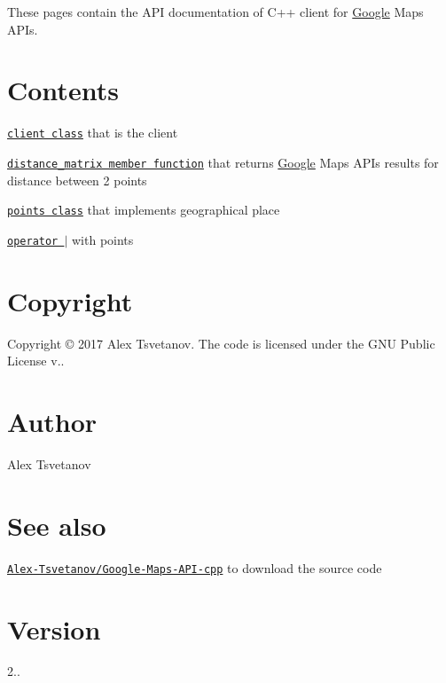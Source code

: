 \href{http://nlohmann.github.io/json}{\tt } \href{https://github.com/Alex-Tsvetanov/Google-Maps-API-cpp/blob/master/LICENSE}{\tt } \href{https://github.com/Alex-Tsvetanov/Google-Maps-API-cpp/releases}{\tt } \href{http://github.com/Alex-Tsvetanov/Google-Maps-API-cpp/issues}{\tt } \href{http://isitmaintained.com/project/Alex-Tsvetanov/Google-Maps-API-cpp}{\tt } \href{https://bestpractices.coreinfrastructure.org/projects/980}{\tt }

These pages contain the A\+PI documentation of C++ client for \hyperlink{a00038}{Google} Maps A\+P\+Is.

\section*{Contents}


\begin{DoxyItemize}
\item \href{./a00047.html}{\tt client class} that is the client
\begin{DoxyItemize}
\item \href{./a00047.html#ac6a0c1904a585c4eb930c17e3dcf2ce9}{\tt distance\+\_\+matrix member function} that returns \hyperlink{a00038}{Google} Maps A\+P\+Is results for distance between 2 points
\end{DoxyItemize}
\item \href{./a00063.html}{\tt points class} that implements geographical place
\begin{DoxyItemize}
\item \href{./a00039.html}{\tt operator $\vert$} with points
\end{DoxyItemize}
\end{DoxyItemize}

\section*{Copyright}

Copyright © 2017 Alex Tsvetanov. The code is licensed under the G\+NU Public License v..

\section*{Author}

Alex Tsvetanov

\section*{See also}

\href{https://github.com/Alex-Tsvetanov/Google-Maps-API-cpp}{\tt Alex-\/\+Tsvetanov/\+Google-\/\+Maps-\/\+A\+P\+I-\/cpp} to download the source code

\section*{Version}

2.. 